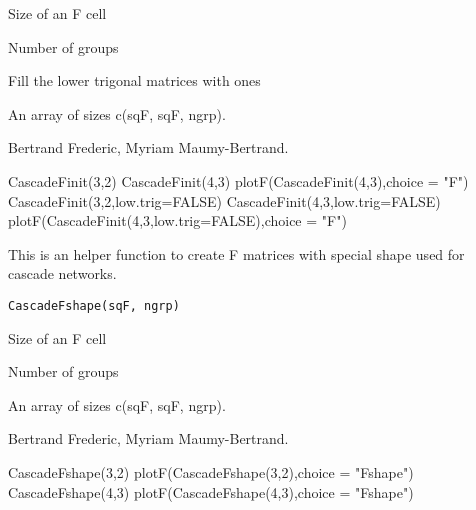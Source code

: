 \documentclass[a4paper]{book}
\begin{document}
%
\begin{Arguments}
\begin{ldescription}
\item[\code{sqF}] Size of an F cell
\item[\code{ngrp}] Number of groups
\item[\code{low.trig}] Fill the lower trigonal matrices with ones
\end{ldescription}
\end{Arguments}
%
\begin{Value}
An array of sizes c(sqF, sqF, ngrp).
\end{Value}
%
\begin{Author}\relax
Bertrand Frederic, Myriam Maumy-Bertrand.
\end{Author}
%
\begin{Examples}
\begin{ExampleCode}
CascadeFinit(3,2)
CascadeFinit(4,3)
plotF(CascadeFinit(4,3),choice = "F")
CascadeFinit(3,2,low.trig=FALSE)
CascadeFinit(4,3,low.trig=FALSE)
plotF(CascadeFinit(4,3,low.trig=FALSE),choice = "F")
\end{ExampleCode}
\end{Examples}
%
\begin{Description}\relax
This is an helper function to create F matrices with special shape used for cascade networks.
\end{Description}
%
\begin{Usage}
\begin{verbatim}
CascadeFshape(sqF, ngrp)
\end{verbatim}
\end{Usage}
%
\begin{Arguments}
\begin{ldescription}
\item[\code{sqF}] Size of an F cell
\item[\code{ngrp}] Number of groups
\end{ldescription}
\end{Arguments}
%
\begin{Value}
An array of sizes c(sqF, sqF, ngrp).
\end{Value}
%
\begin{Author}\relax
Bertrand Frederic, Myriam Maumy-Bertrand.
\end{Author}
%
\begin{Examples}
\begin{ExampleCode}
CascadeFshape(3,2)
plotF(CascadeFshape(3,2),choice = "Fshape")
CascadeFshape(4,3)
plotF(CascadeFshape(4,3),choice = "Fshape")
\end{ExampleCode}
\end{Examples}
\end{document}
